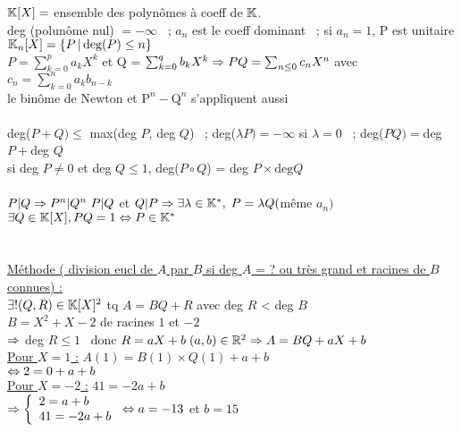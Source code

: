 \documentclass[12 pt]{book}
\begin{document}
\begin{flushleft}
\begin{doublespace}

	$\mathbb{K} [X] =$ ensemble des polynômes à coeff de $\mathbb{K}$.\\
	deg (polunôme nul) $= - \infty$ \ ; $a_n$ est le coeff dominant \ ; si $a_n = 1$, P est unitaire\\
	$\mathbb{K}_n[X] = \{P \, | \, \text{deg}(P)\leq n \}$\\
	$P = \sum_{k = 0}^p a_k X^k$ et Q = $\sum_{k=0}^q b_k X^k \Rightarrow PQ = \sum_{n \leq 0} c_n X^n$ avec $c_n = \sum_{k=0}^n a_k b_{n - k}$\\
	le binôme de Newton et $\text{P}^n - \text{Q}^n$ s'appliquent aussi\\
	
	\text{ }\\
	deg($P + Q) \leq$ max(deg $P$, deg $Q$) \ ; deg($\lambda P) = -\infty$ si $\lambda = 0$ \ ; deg($PQ) = $deg $P + $deg $Q$\\
	si deg $P \ne 0$ et deg $Q \leq 1$, deg($P\circ Q$) = deg $P \times\text{deg} Q$\\
	
	\text{ }\\
	$P|Q \Rightarrow P^n | Q^n \ P|Q$ et $Q|P \Rightarrow \exists \lambda \in \mathbb{K}^*,\; P = \lambda Q ($même $a_n)$\\
	$\exists Q\in \mathbb{K}[X], PQ = 1 \Leftrightarrow P\in \mathbb{K}^*$\\
	\text{}\\
	\text{ }\\
	\underline{Méthode ( division eucl de $A$ par $B$ si deg $A$ = ? ou très grand et racines de $B$ connues) :}\\
	$\exists! (Q,R)\in \mathbb{K}[X]^2$ tq $A = BQ + R$ avec deg $R$ < deg $B$\\
	$B = X^2 + X - 2$ de racines $1$ et $-2$\\
	$\Rightarrow$ deg $R \leq 1$ \, donc $R =aX + b \; (a,b)\in \mathbb{R}^2 \Rightarrow A = BQ + aX + b$\\
	\underline{Pour $X = 1$ :} $A(1) = B(1)\times Q(1) + a + b$\\
	\quad \quad \quad \quad \quad \quad$\Leftrightarrow 2 = 0 + a + b$\\
	\underline{Pour $X = - 2$ :} $41 = - 2a + b$\\
	  $\Rightarrow \left\{\begin{array}{ll} 2 = a + b \\  41 = -2a + b\end{array} \right. \Leftrightarrow a = -13$ et $b = 15$\\
	  

\end{doublespace}
\end{flushleft}
\end{document}
